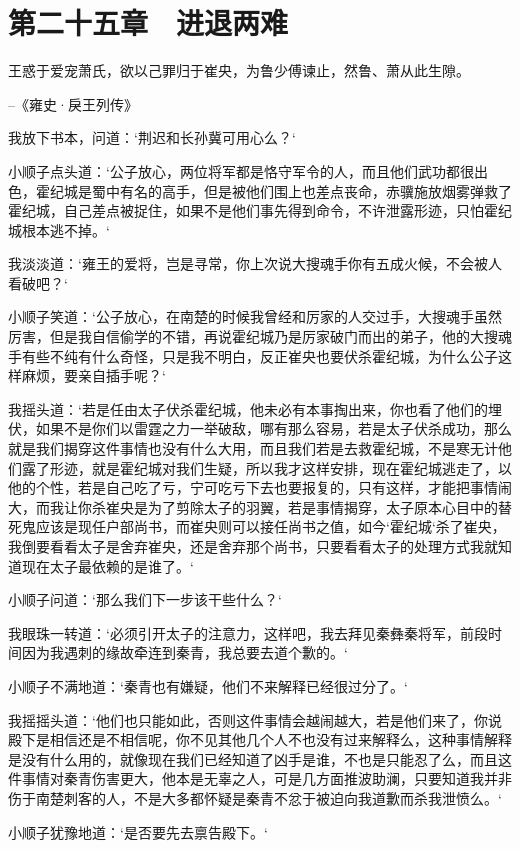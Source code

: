 \chapter{第二十五章　进退两难}

王惑于爱宠萧氏，欲以己罪归于崔央，为鲁少傅谏止，然鲁、萧从此生隙。

--《雍史·戾王列传》

我放下书本，问道：‘荆迟和长孙冀可用心么？‘

小顺子点头道：‘公子放心，两位将军都是恪守军令的人，而且他们武功都很出色，霍纪城是蜀中有名的高手，但是被他们围上也差点丧命，赤骥施放烟雾弹救了霍纪城，自己差点被捉住，如果不是他们事先得到命令，不许泄露形迹，只怕霍纪城根本逃不掉。‘

我淡淡道：‘雍王的爱将，岂是寻常，你上次说大搜魂手你有五成火候，不会被人看破吧？‘

小顺子笑道：‘公子放心，在南楚的时候我曾经和厉家的人交过手，大搜魂手虽然厉害，但是我自信偷学的不错，再说霍纪城乃是厉家破门而出的弟子，他的大搜魂手有些不纯有什么奇怪，只是我不明白，反正崔央也要伏杀霍纪城，为什么公子这样麻烦，要亲自插手呢？‘

我摇头道：‘若是任由太子伏杀霍纪城，他未必有本事掏出来，你也看了他们的埋伏，如果不是你们以雷霆之力一举破敌，哪有那么容易，若是太子伏杀成功，那么就是我们揭穿这件事情也没有什么大用，而且我们若是去救霍纪城，不是寒无计他们露了形迹，就是霍纪城对我们生疑，所以我才这样安排，现在霍纪城逃走了，以他的个性，若是自己吃了亏，宁可吃亏下去也要报复的，只有这样，才能把事情闹大，而我让你杀崔央是为了剪除太子的羽翼，若是事情揭穿，太子原本心目中的替死鬼应该是现任户部尚书，而崔央则可以接任尚书之值，如今‘霍纪城‘杀了崔央，我倒要看看太子是舍弃崔央，还是舍弃那个尚书，只要看看太子的处理方式我就知道现在太子最依赖的是谁了。‘

小顺子问道：‘那么我们下一步该干些什么？‘

我眼珠一转道：‘必须引开太子的注意力，这样吧，我去拜见秦彝秦将军，前段时间因为我遇刺的缘故牵连到秦青，我总要去道个歉的。‘

小顺子不满地道：‘秦青也有嫌疑，他们不来解释已经很过分了。‘

我摇摇头道：‘他们也只能如此，否则这件事情会越闹越大，若是他们来了，你说殿下是相信还是不相信呢，你不见其他几个人不也没有过来解释么，这种事情解释是没有什么用的，就像现在我们已经知道了凶手是谁，不也是只能忍了么，而且这件事情对秦青伤害更大，他本是无辜之人，可是几方面推波助澜，只要知道我并非伤于南楚刺客的人，不是大多都怀疑是秦青不忿于被迫向我道歉而杀我泄愤么。‘

小顺子犹豫地道：‘是否要先去禀告殿下。‘

